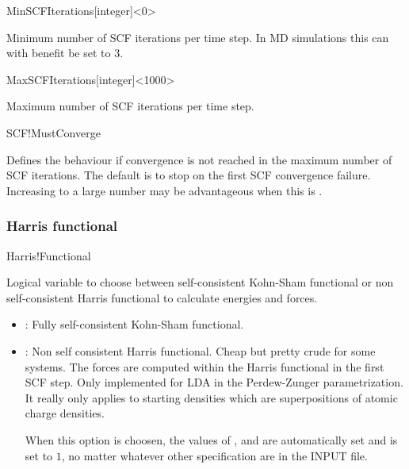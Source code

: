 \begin{fdfentry}{MinSCFIterations}[integer]<0>

  Minimum number of SCF iterations per time step. In MD
  simulations this can with benefit be set to 3.
  
\end{fdfentry}

\begin{fdfentry}{MaxSCFIterations}[integer]<1000>

  Maximum number of SCF iterations per time step. 
  
\end{fdfentry}

\begin{fdflogicalT}{SCF!MustConverge}

  Defines the behaviour if convergence is not reached in the maximum
  number of SCF iterations. The default is to stop on the first SCF
  convergence failure. Increasing  to a large
  number may be advantageous when this is \fdftrue.
  
\end{fdflogicalT}

\subsubsection{Harris functional}

\begin{fdflogicalF}{Harris!Functional}
  
  Logical variable to choose between self-consistent Kohn-Sham
  functional or non self-consistent Harris functional to calculate
  energies and forces.
  \begin{itemize}
    \item \fdffalse: Fully self-consistent Kohn-Sham functional.
    \item \fdftrue: Non self consistent Harris functional. Cheap but
    pretty crude for some systems. The forces are computed within the
    Harris functional in the first SCF step. Only implemented for LDA in
    the Perdew-Zunger parametrization. It really only applies to starting
    densities which are superpositions of atomic charge densities.

    When this option is choosen, the values of ,
     and  are automatically
    set \fdffalse and  is set to $1$, no matter
    whatever other specification are in the INPUT file.
  \end{itemize}

\end{fdflogicalF}


